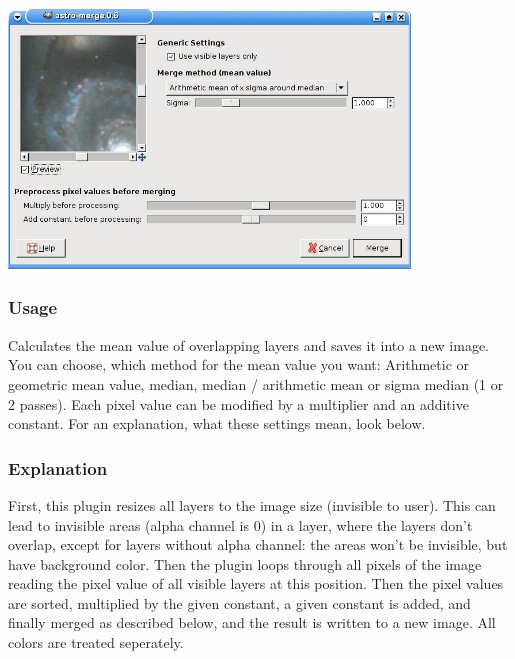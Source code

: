 \documentclass[a4paper]{article}
\begin{document}
\begin{center}\includegraphics[width=0.8\textwidth]{merge.jpg}\end{center}

\subsubsection{Usage}
Calculates the mean value of overlapping layers and saves it into a new image.
You can choose, which method for the mean value you want: Arithmetic or geometric mean value, median, median / arithmetic mean or sigma median (1 or 2 passes).
Each pixel value can be modified by a multiplier and an additive constant.
For an explanation, what these settings mean, look below.

\subsubsection{Explanation}

First, this plugin resizes all layers to the image size (invisible to user).
This can lead to invisible areas (alpha channel is $0$) in a layer, where the layers don't overlap, except for layers without alpha channel: the areas won't be invisible, but have background color.
Then the plugin loops through all pixels of the image reading the pixel value of all visible layers at this position.
Then the pixel values are sorted, multiplied by the given constant, a given constant is added, and finally merged as described below, and the result is written to a new image.
All colors are treated seperately.
\end{document}
